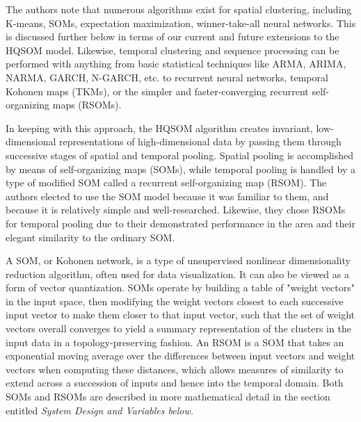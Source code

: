 \documentclass[a4paper,10pt]{article}
\begin{document}
The authors note that numerous algorithms exist for spatial clustering, including K-means, SOMs,
expectation maximization, winner-take-all neural networks. This is discussed further below in terms
of our current and future extensions to the HQSOM model. Likewise, temporal clustering and sequence
processing can be performed with anything from basic statistical techniques like ARMA, ARIMA, NARMA,
GARCH, N-GARCH, etc. to recurrent neural networks, temporal Kohonen maps (TKMs), or the simpler and
faster-converging recurrent self-organizing maps (RSOMs).

In keeping with this approach, the HQSOM algorithm creates invariant, low-dimensional
representations of high-dimensional data by passing them through successive stages of spatial and
temporal pooling. Spatial pooling is accomplished by means of self-organizing maps (SOMs), while
temporal pooling is handled by a type of modified SOM called a recurrent self-organizing map (RSOM).
The authors elected to use the SOM model because it was familiar to them, and because it is
relatively simple and well-researched. Likewise, they chose RSOMs for temporal pooling due to their
demonstrated performance in the area and their elegant similarity to the ordinary SOM.

A SOM, or Kohonen network, is a type of unsupervised nonlinear dimensionality reduction algorithm,
often used for data visualization. It can also be viewed as a form of vector quantization. SOMs
operate by building a table of "weight vectors" in the input space, then modifying the weight
vectors closest to each successive input vector to make them closer to that input vector, such that
the set of weight vectors overall converges to yield a summary representation of the clusters in the
input data in a topology-preserving fashion. An RSOM is a SOM that takes an exponential moving
average over the differences between input vectors and weight vectors when computing these
distances, which allows measures of similarity to extend across a succession of inputs and hence
into the temporal domain. Both SOMs and RSOMs are described in more mathematical detail in the
section entitled \em System Design and Variables \em below.
\end{document}
